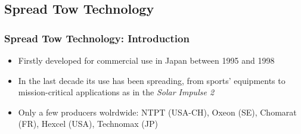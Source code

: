 \documentclass[first,firstsupp,lastsupp,handout,last,hyperref,table]{ETHclass}
\begin{document}
\subsection{Spread Tow Technology}

\begin{frame}
\frametitle{Spread Tow Technology: Introduction}
\vspace{-0.25cm}
\centering
\begin{itemize}
	\item {\small Firstly developed for commercial use in Japan between 1995 and 1998}
	\item {\small In the last decade its use has been spreading, from sports' equipments to mission-critical applications as in the \textit{Solar Impulse 2}}
	\item {\small Only a few producers wolrdwide: NTPT (USA-CH), Oxeon (SE), Chomarat (FR), Hexcel (USA), Technomax (JP)}
\end{itemize}
\begin{figure}[!h]
\centering
{}\quad
{}
  \label{fig:thin-ply-examples}
\end{figure}
\end{frame}
\end{document}

